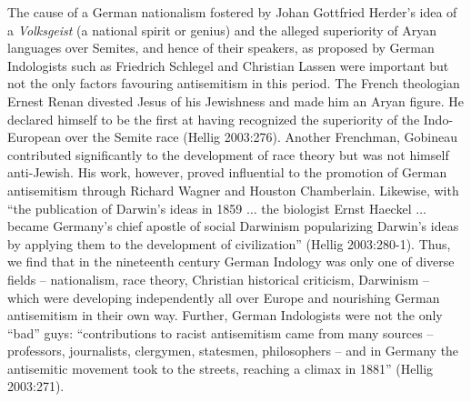 The cause of a German nationalism fostered by Johan Gottfried Herder’s idea of a {\sl Volksgeist} (a national spirit or genius) and the alleged superiority of Aryan languages over Semites, and hence of their speakers, as proposed by German Indologists such as Friedrich Schlegel and Christian Lassen were important but not the only factors favouring antisemitism in this period. The French theologian Ernest Renan divested Jesus of his Jewishness and made him an Aryan figure. He declared himself to be the first at having recognized the superiority of the Indo-European over the Semite race (Hellig 2003:276). Another Frenchman, Gobineau contributed significantly to the development of race theory but was not himself anti-Jewish. His work, however, proved influential to the promotion of German antisemitism through Richard Wagner and Houston Chamberlain. Likewise, with “the publication of Darwin’s ideas in 1859 $\ldots$ the biologist Ernst Haeckel $\ldots$ became Germany’s chief apostle of social Darwinism popularizing Darwin’s ideas by applying them to the development of civilization” (Hellig 2003:280-1). Thus, we find that in the nineteenth century German Indology was only one of diverse fields – nationalism, race theory, Christian historical criticism, Darwinism – which were developing independently all over Europe and nourishing German antisemitism in their own way. Further, German Indologists were not the only “bad” guys: “contributions to racist antisemitism came from many sources – professors, journalists, clergymen, statesmen, philosophers – and in Germany the antisemitic movement took to the streets, reaching a climax in 1881” (Hellig 2003:271). 

